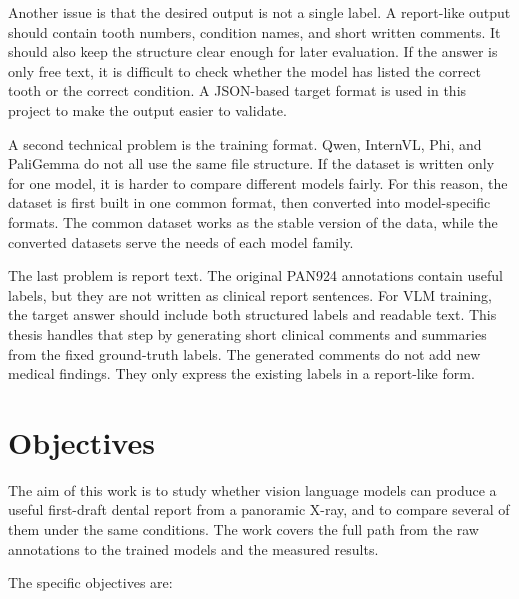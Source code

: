\documentclass[a4paper,12pt]{report}
\begin{document}
Another issue is that the desired output is not a single label. A report-like output should contain tooth numbers, condition names, and short written comments. It should also keep the structure clear enough for later evaluation. If the answer is only free text, it is difficult to check whether the model has listed the correct tooth or the correct condition. A JSON-based target format is used in this project to make the output easier to validate.

A second technical problem is the training format. Qwen, InternVL, Phi, and PaliGemma do not all use the same file structure. If the dataset is written only for one model, it is harder to compare different models fairly. For this reason, the dataset is first built in one common format, then converted into model-specific formats. The common dataset works as the stable version of the data, while the converted datasets serve the needs of each model family.

The last problem is report text. The original PAN924 annotations contain useful labels, but they are not written as clinical report sentences. For VLM training, the target answer should include both structured labels and readable text. This thesis handles that step by generating short clinical comments and summaries from the fixed ground-truth labels. The generated comments do not add new medical findings. They only express the existing labels in a report-like form.


\section{Objectives}
The aim of this work is to study whether vision language models can produce a useful first-draft dental report from a panoramic X-ray, and to compare several of them under the same conditions. The work covers the full path from the raw annotations to the trained models and the measured results.

The specific objectives are:
\end{document}
